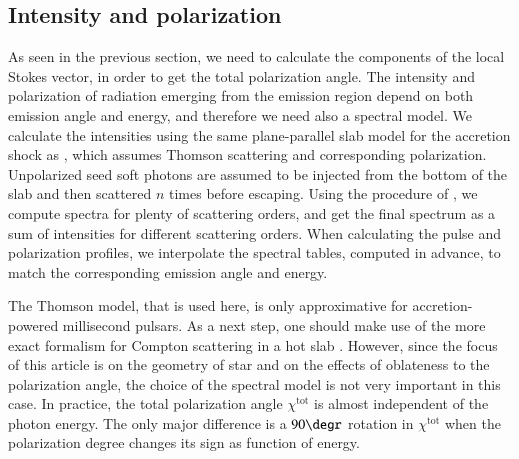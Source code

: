 \documentclass{aa}
\newcommand{\blue}[1]{\textcolor{blue}{#1}}
\begin{document}
\subsection{Intensity and polarization}\label{sec:thomson_atm}


As seen in the previous section, we need to calculate the components of the local Stokes vector, in order to get the total polarization angle.
The intensity and polarization of radiation emerging from the emission region depend on both emission angle and energy, and therefore we need also a spectral model. 
We calculate the intensities using the same plane-parallel slab model for the accretion shock as \citet{VP04}  \citep[see also][]{ST85}, which assumes Thomson scattering and corresponding polarization.
Unpolarized seed soft photons are assumed to be injected from the bottom of the slab and then scattered $n$ times before escaping.
Using the procedure of \citet{VP04}, we compute spectra for plenty of scattering orders, and get the final spectrum as a sum of intensities for different scattering orders.
When calculating the pulse and polarization profiles, we interpolate the spectral tables, computed in advance, to match the corresponding emission angle and energy.

The Thomson model, that is used here, is only approximative for accretion-powered millisecond pulsars. 
As a next step, one should make use of the more exact formalism for Compton scattering in a hot slab \citep[see e.g.][]{PS96}.
However, since the focus of this article is on the geometry of star and on the effects of oblateness to the polarization angle, the choice of the spectral model is not very important in this case. 
In practice, the total polarization angle $\chi^{\mathrm{tot}}$ is almost independent of the photon energy.
The only major difference is a $90 \degr$ rotation in $\chi^{\mathrm{tot}}$ when the polarization degree changes its sign as function of energy.

\iffalse 
\end{document}
